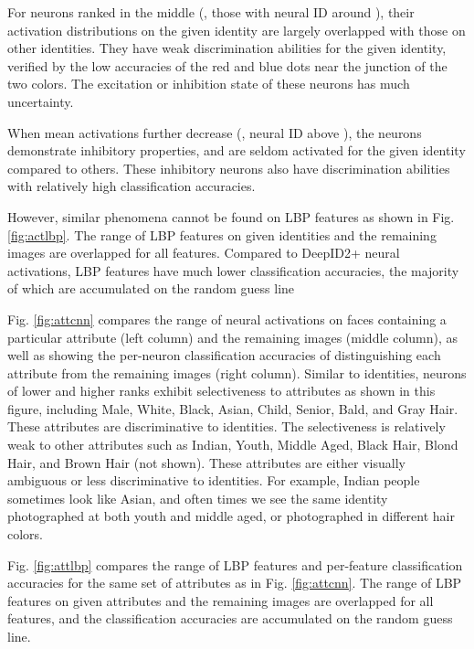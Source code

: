 \documentclass[10pt,twocolumn,letterpaper]{article}
\begin{document}
For neurons ranked in the middle (\eg, those with neural ID around ), their activation distributions on the given identity are largely overlapped with those on other identities. They have weak discrimination abilities for the given identity, verified by the low accuracies of the red and blue dots near the junction of the two colors. The excitation or inhibition state of these neurons has much uncertainty.

When mean activations further decrease (\eg, neural ID above ), the neurons demonstrate inhibitory properties, and are seldom activated for the given identity compared to others. These inhibitory neurons also have discrimination abilities with relatively high classification accuracies.

However, similar phenomena cannot be found on LBP features as shown in Fig. \ref{fig:actlbp}. The range of LBP features on given identities and the remaining images are overlapped for all features. Compared to DeepID2+ neural activations, LBP features have much lower classification accuracies, the majority of which are accumulated on the  random guess line

Fig. \ref{fig:attcnn} compares the range of neural activations on faces containing a particular attribute (left column) and the remaining images (middle column), as well as showing the per-neuron classification accuracies of distinguishing each attribute from the remaining images (right column). Similar to identities, neurons of lower and higher ranks exhibit selectiveness to attributes as shown in this figure, including Male, White, Black, Asian, Child, Senior, Bald, and Gray Hair. These attributes are discriminative to identities. The selectiveness is relatively weak to other attributes such as Indian, Youth, Middle Aged, Black Hair, Blond Hair, and Brown Hair (not shown). These attributes are either visually ambiguous or less discriminative to identities. For example, Indian people sometimes look like Asian, and often times we see the same identity photographed at both youth and middle aged, or photographed in different hair colors.

Fig. \ref{fig:attlbp} compares the range of LBP features and per-feature classification accuracies for the same set of attributes as in Fig. \ref{fig:attcnn}. The range of LBP features on given attributes and the remaining images are overlapped for all features, and the classification accuracies are accumulated on the  random guess line.
\end{document}
